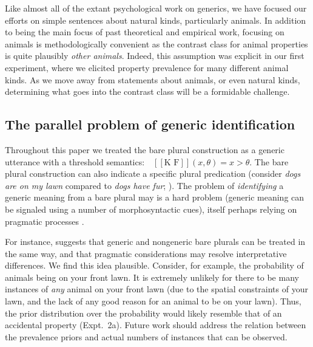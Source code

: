 \documentclass[12pt,letterpaper]{article}
\newcommand{\denote}[1]{\mbox{ $[\![ #1 ]\!]$}}
\begin{document}
Like almost all of the extant psychological work on generics, we have focused our efforts on simple sentences about natural kinds, particularly animals.
In addition to being the main focus of past theoretical and empirical work, focusing on animals is methodologically convenient as the contrast class for animal properties is quite plausibly \emph{other animals}.
Indeed, this assumption was explicit in our first experiment, where we elicited  property prevalence for many different animal kinds. 
As we move away from statements about animals, or even natural kinds, determining what goes into the contrast class will be a formidable challenge.


\subsection*{The parallel problem of generic identification}

Throughout this paper we treated the bare plural construction as a generic utterance with a threshold semantics: $\denote{\text{K F}}(x, \theta)=x>\theta$.
The bare plural construction can also indicate a specific plural predication (consider \emph{dogs are on my lawn} compared to \emph{dogs have fur};  ).
The problem of \emph{identifying} a generic meaning from a bare plural may is a hard problem (generic meaning can be signaled using a number of morphosyntactic cues), itself perhaps relying on pragmatic processes \cite{Cimpian2008, Declerck1991}. 

For instance,  suggests that generic and nongeneric bare plurals can be treated in the same way, and that pragmatic considerations may resolve interpretative differences. 
We find this idea plausible.
Consider, for example, the probability of animals being on your front lawn. 
It is extremely unlikely for there to be many instances of \emph{any} animal on your front lawn (due to the spatial constraints of your lawn, and the lack of any good reason for an animal to be on your lawn). 
Thus, the prior distribution over the probability would likely resemble that of an accidental property (Expt.~2a).
Future work should address the relation between the prevalence priors and actual numbers of instances that can be observed.

\end{document}
